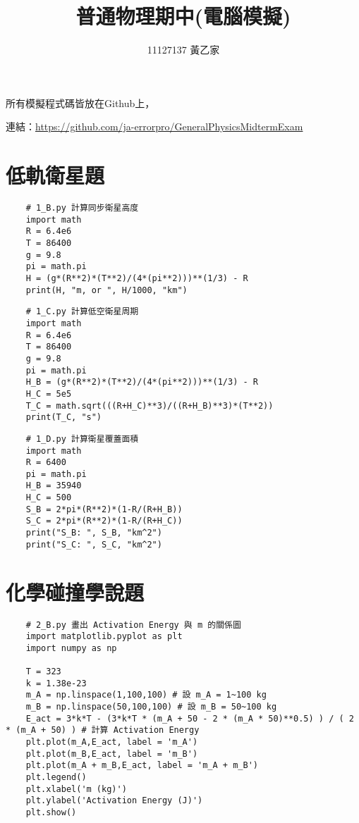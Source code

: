 \documentclass[UTF8,a4paper,12pt]{article}
\title{\fontsize{18pt}{\baselineskip} \textbf{普通物理期中(電腦模擬)}}
\author{\fontsize{16pt}{\baselineskip}11127137 黃乙家}
\date{}
\begin{document}
\maketitle

\fontsize{12pt}{\baselineskip}

所有模擬程式碼皆放在Github上，

連結：\url{https://github.com/ja-errorpro/GeneralPhysicsMidtermExam}

\section{低軌衛星題}

\begin{lstlisting}
    # 1_B.py 計算同步衛星高度
    import math
    R = 6.4e6
    T = 86400
    g = 9.8
    pi = math.pi
    H = (g*(R**2)*(T**2)/(4*(pi**2)))**(1/3) - R
    print(H, "m, or ", H/1000, "km")
\end{lstlisting}

\newpage

\begin{lstlisting}
    # 1_C.py 計算低空衛星周期
    import math
    R = 6.4e6
    T = 86400
    g = 9.8
    pi = math.pi
    H_B = (g*(R**2)*(T**2)/(4*(pi**2)))**(1/3) - R
    H_C = 5e5
    T_C = math.sqrt(((R+H_C)**3)/((R+H_B)**3)*(T**2))
    print(T_C, "s")
\end{lstlisting}

\newpage

\begin{lstlisting}
    # 1_D.py 計算衛星覆蓋面積
    import math
    R = 6400
    pi = math.pi
    H_B = 35940
    H_C = 500
    S_B = 2*pi*(R**2)*(1-R/(R+H_B))
    S_C = 2*pi*(R**2)*(1-R/(R+H_C))
    print("S_B: ", S_B, "km^2")
    print("S_C: ", S_C, "km^2")
\end{lstlisting}

\newpage

\section{化學碰撞學說題}

\begin{lstlisting}
    # 2_B.py 畫出 Activation Energy 與 m 的關係圖
    import matplotlib.pyplot as plt
    import numpy as np
    
    T = 323
    k = 1.38e-23
    m_A = np.linspace(1,100,100) # 設 m_A = 1~100 kg
    m_B = np.linspace(50,100,100) # 設 m_B = 50~100 kg
    E_act = 3*k*T - (3*k*T * (m_A + 50 - 2 * (m_A * 50)**0.5) ) / ( 2 * (m_A + 50) ) # 計算 Activation Energy
    plt.plot(m_A,E_act, label = 'm_A')
    plt.plot(m_B,E_act, label = 'm_B')
    plt.plot(m_A + m_B,E_act, label = 'm_A + m_B')
    plt.legend()
    plt.xlabel('m (kg)')
    plt.ylabel('Activation Energy (J)')
    plt.show()
\end{lstlisting}
\end{document}
